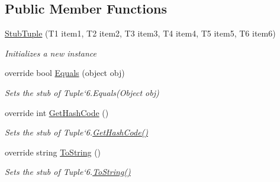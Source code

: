 \subsection*{Public Member Functions}
\begin{DoxyCompactItemize}
\item 
\hyperlink{class_system_1_1_fakes_1_1_stub_tuple_3_01_t1_00_01_t2_00_01_t3_00_01_t4_00_01_t5_00_01_t6_01_4_ad7b639f8cc4538d25688376a2d191ec2}{Stub\-Tuple} (T1 item1, T2 item2, T3 item3, T4 item4, T5 item5, T6 item6)
\begin{DoxyCompactList}\small\item\em Initializes a new instance\end{DoxyCompactList}\item 
override bool \hyperlink{class_system_1_1_fakes_1_1_stub_tuple_3_01_t1_00_01_t2_00_01_t3_00_01_t4_00_01_t5_00_01_t6_01_4_a403c55387abfc7ee8b4f497be5621b0d}{Equals} (object obj)
\begin{DoxyCompactList}\small\item\em Sets the stub of Tuple`6.Equals(\-Object obj)\end{DoxyCompactList}\item 
override int \hyperlink{class_system_1_1_fakes_1_1_stub_tuple_3_01_t1_00_01_t2_00_01_t3_00_01_t4_00_01_t5_00_01_t6_01_4_a90ab03c90d73a050914af7006ecb88e3}{Get\-Hash\-Code} ()
\begin{DoxyCompactList}\small\item\em Sets the stub of Tuple`6.\hyperlink{class_system_1_1_fakes_1_1_stub_tuple_3_01_t1_00_01_t2_00_01_t3_00_01_t4_00_01_t5_00_01_t6_01_4_a90ab03c90d73a050914af7006ecb88e3}{Get\-Hash\-Code()}\end{DoxyCompactList}\item 
override string \hyperlink{class_system_1_1_fakes_1_1_stub_tuple_3_01_t1_00_01_t2_00_01_t3_00_01_t4_00_01_t5_00_01_t6_01_4_a2be9c97e4cec3162c563bc878932fff0}{To\-String} ()
\begin{DoxyCompactList}\small\item\em Sets the stub of Tuple`6.\hyperlink{class_system_1_1_fakes_1_1_stub_tuple_3_01_t1_00_01_t2_00_01_t3_00_01_t4_00_01_t5_00_01_t6_01_4_a2be9c97e4cec3162c563bc878932fff0}{To\-String()}\end{DoxyCompactList}\end{DoxyCompactItemize}
